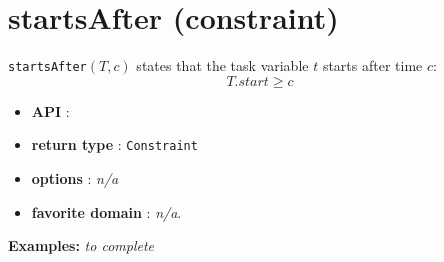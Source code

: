 \section{startsAfter (constraint)}\label{startsafter:startsafterconstraint}\hypertarget{startsafter:startsafterconstraint}{}
\begin{notedef}
  \texttt{startsAfter}$(T,c)$ states that the task variable $t$ starts after time $c$:
  $$T.start \ge c$$
\end{notedef}

\begin{itemize}
	\item \textbf{API} :
	\item \textbf{return type} : \texttt{Constraint}
	\item \textbf{options} : \emph{n/a}
	\item \textbf{favorite domain} : \emph{n/a}.
\end{itemize}

\textbf{Examples:}
%
\emph{to complete}
